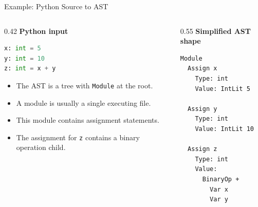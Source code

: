 \documentclass[aspectratio=169,11pt]{beamer}
\begin{document}
\begin{frame}[fragile]{Example: Python Source to AST}
	\small

	\begin{columns}[T,onlytextwidth]
		\begin{column}{0.42\textwidth}
			\textbf{Python input}

			\vspace{0.1cm}
			\begin{lstlisting}[language=Python,basicstyle=\ttfamily\scriptsize]
x: int = 5
y: int = 10
z: int = x + y
			\end{lstlisting}

			\vspace{0.15cm}
			\begin{itemize}
				\item The AST is a tree with \texttt{Module} at the root.
				\item A module is usually a single executing file.
				\item This module contains assignment statements.
				\item The assignment for \texttt{z} contains a binary operation child.
			\end{itemize}
		\end{column}

		\begin{column}{0.55\textwidth}
			\textbf{Simplified AST shape}

			\vspace{0.1cm}
			\begin{lstlisting}[basicstyle=\ttfamily\scriptsize]
Module
  Assign x
    Type: int
    Value: IntLit 5

  Assign y
    Type: int
    Value: IntLit 10

  Assign z
    Type: int
    Value:
      BinaryOp +
        Var x
        Var y
			\end{lstlisting}
		\end{column}
	\end{columns}
\end{frame}
\end{document}

